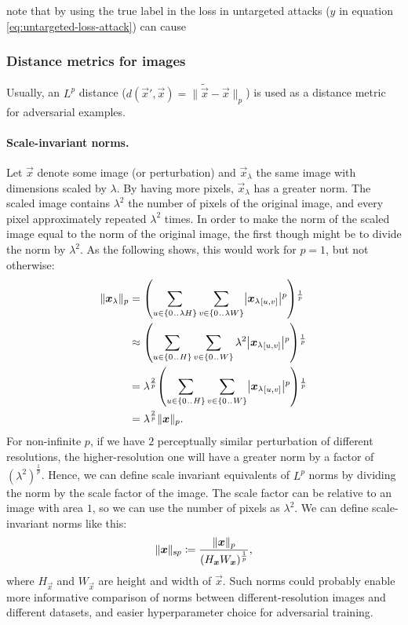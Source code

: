 \documentclass{article}
\begin{document}
\cite{Kurakin:2016:AMLS} note that by using the true label in the loss in untargeted attacks ($y$ in equation \eqref{eq:untargeted-loss-attack}) can cause

\subsubsection{Distance metrics for images}

Usually, an $L^p$ distance ($d(\vec x', \vec x)=\lVert\tilde{\vec x}-\vec x\rVert_p$) is used as a distance metric for adversarial examples.

\paragraph{Scale-invariant norms.}
Let $\vec x$ denote some image (or perturbation) and $\vec x_\lambda$ the same image with dimensions scaled by $\lambda$. By having more pixels, $\vec x_\lambda$ has a greater norm. The scaled image contains $\lambda^2$ the number of pixels of the original image, and every pixel approximately repeated $\lambda^2$ times. In order to make the norm of the scaled image equal to the norm of the original image, the first though might be to divide the norm by $\lambda^2$. As the following shows, this would work for $p=1$, but not otherwise: 
\begin{align}
    \enVert{\vec x_\lambda}_p 
    &= \del{\sum_{u\in\cbr{0\bidot\lambda H}}\sum_{v\in\cbr{0\bidot\lambda W}} \envert{{\vec x_\lambda}_\ind{u, v}}^p}^{\frac{1}{p}} \\
    &\approx \del{\sum_{u\in\cbr{0\bidot H}}\sum_{v\in\cbr{0\bidot W}} \lambda^2 \envert{{\vec x_\lambda}_\ind{u, v}}^p}^{\frac{1}{p}} \\
    &= \lambda^\frac{2}{p} \del{\sum_{u\in\cbr{0\bidot H}}\sum_{v\in\cbr{0\bidot W}} \envert{{\vec x_\lambda}_\ind{u, v}}^p}^{\frac{1}{p}} \\
    &= \lambda^\frac{2}{p} \enVert{\vec x}_p \text{.}
\end{align}
For non-infinite $p$, if we have $2$ perceptually similar perturbation of different resolutions, the higher-resolution one will have a greater norm by a factor of $(\lambda^2)^\frac{1}{p}$. Hence, we can define scale invariant equivalents of $L^p$ norms by dividing the norm by the scale factor of the image. The scale factor can be relative to an image with area $1$, so we can use the number of pixels as $\lambda^2$. We can define scale-invariant norms like this:
\begin{align}
    \enVert{\vec x}_{\text{s}p} \coloneqq \frac{\enVert{\vec x}_p}{\del{H_\vec{x}W_\vec{x}}^\frac{1}{p}},
\end{align}
where $H_\vec{x}$ and $W_\vec{x}$ are height and width of $\vec x$. Such norms could probably enable more informative comparison of norms between different-resolution images and different datasets, and easier hyperparameter choice for adversarial training.
\end{document}
